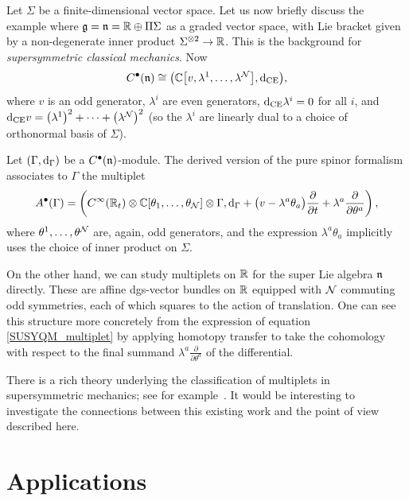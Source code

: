 \documentclass[pdftex]{sigma}
\numberwithin{equation}{section}
\def\d{{\rm d}}
\begin{document}
\begin{eg}
	Let $\Sigma$ be a finite-dimensional vector space. Let us now briefly discuss the example where $\mathfrak g = \mathfrak n = \mathbb R \oplus \Pi \Sigma$ as a graded vector space, with Lie bracket given by a non-degenerate inner product $\Sigma^{\otimes 2} \to \mathbb R$. This is the background for \emph{supersymmetric classical mechanics}. Now
	\begin{equation*}
	C^\bullet(\fn) \cong \big(\CC\big[v, \lambda^1, \ldots, \lambda^\cN\big] , \d_{\mathrm{CE}}\big),
	\end{equation*}
	where $v$ is an odd generator, $\lambda^i$ are even generators, $\d_{\mathrm{CE}} \lambda^i = 0$ for all $i$, and $\d_{\mathrm{CE}} v = \big(\lambda^1\big)^2 + \cdots + \big(\lambda^\cN\big)^2$ (so the $\lambda^i$ are linearly dual to a choice of orthonormal basis of $\Sigma$).
	
	Let $(\Gamma, \d_\Gamma)$ be a $C^\bullet(\mathfrak n)$-module. The derived version of the pure spinor formalism associates to $\Gamma$ the multiplet
	\begin{equation} \label{SUSYQM_multiplet}
	A^\bullet(\Gamma) = \left(C^\infty(\RR_t) \otimes \CC[\theta_1, \ldots, \theta_\cN] \otimes \Gamma , \d_\Gamma + \big(v - \lambda^a\theta_a\big)\frac{\partial}{\partial t} + \lambda^a \frac{\partial}{\partial \theta^a}\right),
	\end{equation}
	where $\theta^1, \ldots, \theta^\mathcal N$ are, again, odd generators, and the expression $\lambda^a \theta_a$ implicitly uses the choice of inner product on $\Sigma$.
	
	On the other hand, we can study multiplets on $\mathbb R$ for the super Lie algebra $\mathfrak n$ directly. These are affine dgs-vector bundles on $\mathbb R$ equipped with $\mathcal N$ commuting odd symmetries, each of which squares to the action of translation. One can see this structure more concretely from the expression of equation \eqref{SUSYQM_multiplet} by applying homotopy transfer to take the cohomology with respect to the final summand $\lambda^a \frac{\partial}{\partial \theta^a}$ of the differential.
	
	There is a rich theory underlying the classification of multiplets in supersymmetric mechanics; see for example~\cite{FauxGates}. It would be interesting to investigate the connections between this existing work and the point of view described here.
\end{eg}

\section{Applications}
\label{sec: examples}
\end{document}
